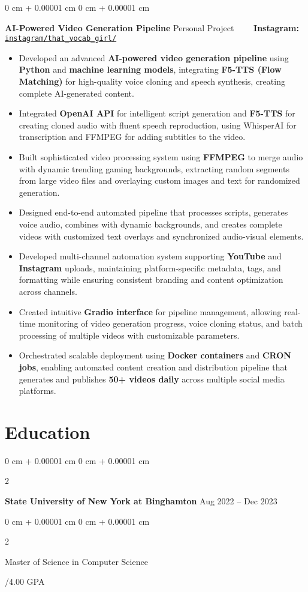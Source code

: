 \documentclass[10pt, letterpaper]{article}
\newenvironment{highlights}{
    \begin{itemize}[
        topsep=0.10 cm,
        parsep=0.10 cm,
        partopsep=0pt,
        itemsep=0pt,
        leftmargin=0 cm + 10pt
    ]
}{
    \end{itemize}
} %
\newenvironment{onecolentry}{
    \begin{adjustwidth}{
        0 cm + 0.00001 cm
    }{
        0 cm + 0.00001 cm
    }
}{
    \end{adjustwidth}
} %
\newenvironment{twocolentry}[2][]{
    \onecolentry
    \def\secondColumn{#2}
    \setcolumnwidth{\fill, 4.5 cm}
    \begin{paracol}{2}
}{
    \switchcolumn \raggedleft \secondColumn
    \end{paracol}
    \endonecolentry
} %
\begin{document}
\begin{onecolentry}
	\textbf{AI-Powered Video Generation Pipeline} \hfill Personal Project \ \ \ \ \textbf{Instagram:} \href{https://www.instagram.com/thatvocabguy/}{\texttt{instagram/that\_vocab\_girl/}}
	\begin{highlights}
		\item Developed an advanced \textbf{AI-powered video generation pipeline} using \textbf{Python} and \textbf{machine learning models}, integrating \textbf{F5-TTS (Flow Matching)} for high-quality voice cloning and speech synthesis, creating complete AI-generated content.
		\item Integrated \textbf{OpenAI API} for intelligent script generation and \textbf{F5-TTS} for creating cloned audio with fluent speech reproduction, using WhisperAI for transcription and FFMPEG for adding subtitles to the video.
		\item Built sophisticated video processing system using \textbf{FFMPEG} to merge audio with dynamic trending gaming backgrounds, extracting random segments from large video files and overlaying custom images and text for randomized generation.
		\item Designed end-to-end automated pipeline that processes scripts, generates voice audio, combines with dynamic backgrounds, and creates complete videos with customized text overlays and synchronized audio-visual elements.
		\item Developed multi-channel automation system supporting \textbf{YouTube} and \textbf{Instagram} uploads, maintaining platform-specific metadata, tags, and formatting while ensuring consistent branding and content optimization across channels.
		\item Created intuitive \textbf{Gradio interface} for pipeline management, allowing real-time monitoring of video generation progress, voice cloning status, and batch processing of multiple videos with customizable parameters.
		\item Orchestrated scalable deployment using \textbf{Docker containers} and \textbf{CRON jobs}, enabling automated content creation and distribution pipeline that generates and publishes \textbf{50+ videos daily} across multiple social media platforms.
	\end{highlights}
\end{onecolentry}






\section{Education}
\begin{twocolentry}{
		Aug 2022 – Dec 2023
	}
	\textbf{State University of New York at Binghamton}\end{twocolentry}

\begin{twocolentry}{
		3.44/4.00 GPA
	}
	Master of Science in Computer Science
\end{twocolentry}
\end{document}
